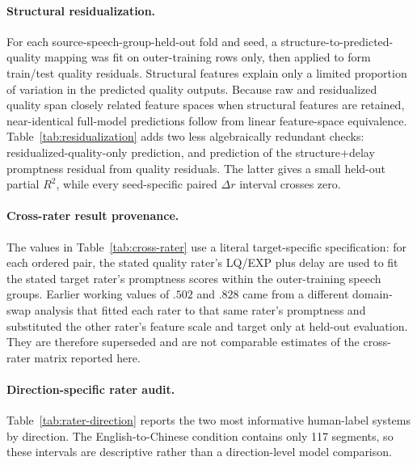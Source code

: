 

\paragraph{Structural residualization.} For each source-speech-group-held-out
fold and seed, a structure-to-predicted-quality mapping was fit on outer-training
rows only, then applied to form train/test quality residuals. Structural features
explain only a limited proportion of variation in the predicted quality outputs.
Because raw and residualized quality span closely related feature spaces when
structural features are retained, near-identical full-model predictions follow
from linear feature-space equivalence. Table~\ref{tab:residualization}
adds two less algebraically redundant checks: residualized-quality-only prediction,
and prediction of the structure+delay promptness residual from quality residuals.
The latter gives a small held-out partial $R^2$, while every seed-specific paired
$\Delta r$ interval crosses zero.



\paragraph{Cross-rater result provenance.} The values in Table~\ref{tab:cross-rater}
use a literal target-specific specification: for each ordered pair, the stated
quality rater's LQ/EXP plus delay are used to fit the stated target rater's
promptness scores within the outer-training speech groups. Earlier working values
of $.502$ and $.828$ came from a different domain-swap analysis that fitted each
rater to that same rater's promptness and substituted the other rater's feature
scale and target only at held-out evaluation. They are therefore superseded and
are not comparable estimates of the cross-rater matrix reported here.

\paragraph{Direction-specific rater audit.} Table~\ref{tab:rater-direction}
reports the two most informative human-label systems by direction. The
English-to-Chinese condition contains only 117 segments, so these intervals are
descriptive rather than a direction-level model comparison.



